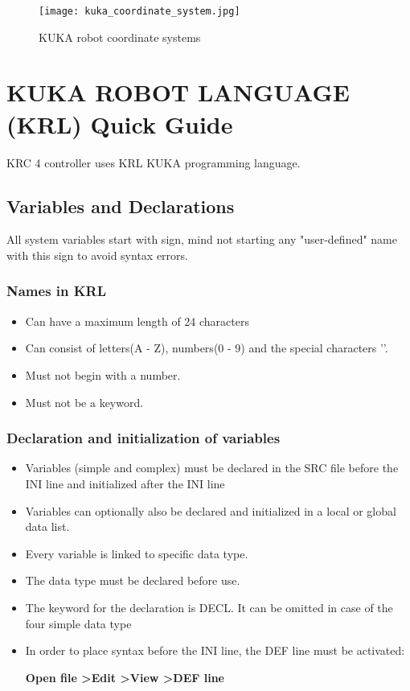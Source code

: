 \documentclass[a4paper]{report}
\begin{document}
\begin{figure}[h]
	\caption{KUKA robot coordinate systems}
	\centering
\texttt{[image: kuka\_coordinate\_system.jpg]}
\end{figure} 
\newpage
\section{KUKA ROBOT LANGUAGE (KRL) Quick Guide}
KRC 4 controller uses KRL KUKA programming language.
\subsection{Variables and Declarations}
All system variables start with \textdollar sign, mind not starting any "user-defined" name with this sign to avoid syntax errors.
\vspace{0.5cm}
\subsubsection{Names in KRL}
\begin{itemize}
	\item Can have a maximum length of 24 characters
	\item Can consist of letters(A - Z), numbers(0 - 9) and the special characters '\textdollar'.
	\item Must not begin with a number.
	\item Must not be a keyword.
\end{itemize}
\subsubsection{Declaration and initialization of variables}
\begin{itemize}
	\item Variables (simple and complex) must be declared in the SRC file before the INI line and initialized after the INI line
	\item Variables can optionally also be declared and initialized in a local or global data list. 
	\item Every variable is linked to specific data type.
	\item The data type must be declared before use.
	\item The keyword for the declaration is DECL. It can be omitted in case of the four simple data type	
	\item In order to place syntax before the INI line, the DEF line must be activated:
	
	\centering	\textbf{  Open file \textgreater Edit \textgreater View \textgreater DEF line}
\end{itemize}
\end{document}
